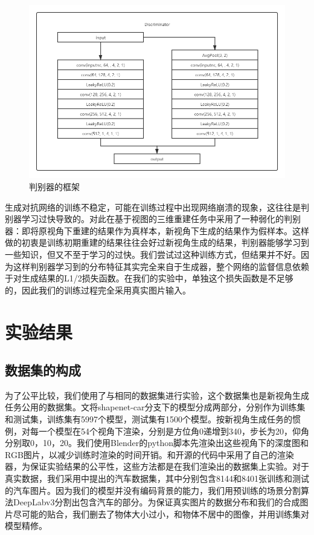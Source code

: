 \documentclass[UTF8,openany,AutoFakeBold,AutoFakeSlant,cs4size]{ctexbook}
\begin{document}
\begin{figure}
\centering
\includegraphics[width=15cm]{./images/discriminator.png}
\caption{判别器的框架}
\label{fig:sample}
\end{figure}

生成对抗网络的训练不稳定，可能在训练过程中出现网络崩溃的现象，这往往是判别器学习过快导致的。对此\cite{kato2019vpl}在基于视图的三维重建任务中采用了一种弱化的判别器：即将原视角下重建的结果作为真样本，新视角下生成的结果作为假样本。这样做的初衷是训练初期重建的结果往往会好过新视角生成的结果，判别器能够学习到一些知识，但又不至于学习的过快。我们尝试过这种训练方式，但结果并不好。因为这样判别器学习到的分布特征其实完全来自于生成器，整个网络的监督信息依赖于对生成结果的L1/2损失函数。在我们的实验中，单独这个损失函数是不足够的，因此我们的训练过程完全采用真实图片输入。



\clearpage

\chapter{实验结果}

\section{数据集的构成}

为了公平比较，我们使用了与\cite{Zhou2016ViewSB}相同的数据集进行实验，这个数据集也是新视角生成任务公用的数据集。\cite{Zhou2016ViewSB}文将shapenet-car分支下的模型分成两部分，分别作为训练集和测试集，训练集有5997个模型，测试集有1500个模型。按新视角生成任务的惯例，对每一个模型在54个视角下渲染，分别是方位角0递增到340，步长为20，仰角分别取0，10，20。我们使用Blender的python脚本先渲染出这些视角下的深度图和RGB图片，以减少训练时渲染的时间开销。\cite{Zhou2016ViewSB}和\cite{Su2015MultiviewCN}开源的代码中采用了自己的渲染器，为保证实验结果的公平性，这些方法都是在我们渲染出的数据集上实验。对于真实数据，我们采用\cite{6755945}中提出的汽车数据集，其中分别包含8144和8401张训练和测试的汽车图片。因为我们的模型并没有编码背景的能力，我们用预训练的场景分割算法DeepLabv3\cite{Chen2017RethinkingAC}分割出包含汽车的部分。为保证真实图片的数据分布和我们的合成图片尽可能的贴合，我们删去了物体大小过小，和物体不居中的图像，并用训练集对模型精修。
\end{document}
